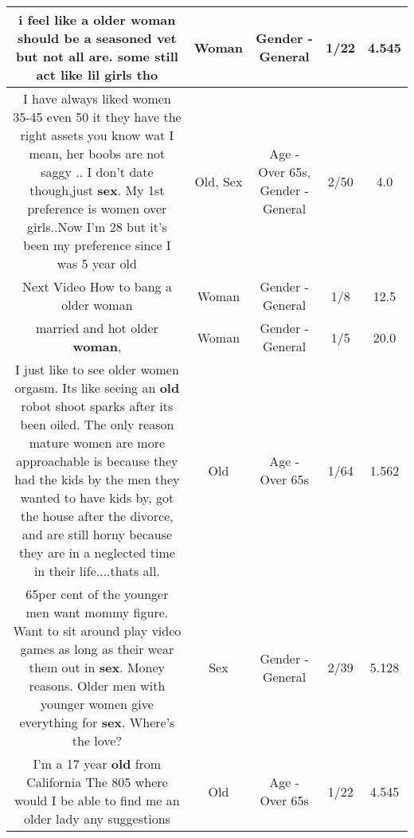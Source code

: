 \documentclass[11pt]{article}
\newlength\mylength
\begin{document}
\begin{center}
\begin{longtable}{|C{.65\mylength}|C{.30\mylength}|C{.12\mylength}|C{.12\mylength}|C{.12\mylength}|}
  \small i feel like a older \textbf{woman} should be a seasoned vet but not all are. some still act like lil girls tho\normalsize   & Woman & Gender - General & 1/22 & 4.545 \\  \hline
  \small I have always liked women 35-45 even 50 it they have the right assets you know wat I mean, her boobs are not saggy .. I don't date though,just \textbf{sex}. My 1st preference is women over girls..Now I'm 28 but it's been my preference since I was 5 year old\normalsize   & Old, Sex & Age - Over 65s, Gender - General & 2/50 & 4.0 \\  \hline
  \small Next Video How to bang a older woman\normalsize   & Woman & Gender - General & 1/8 & 12.5 \\  \hline
  \small married and hot older \textbf{woman},\normalsize   & Woman & Gender - General & 1/5 & 20.0 \\  \hline
  \small I just like to see older women orgasm. Its like seeing an \textbf{old} robot shoot sparks after its been oiled. The only reason mature women are more approachable is because they had the kids by the men they wanted to have kids by, got the house after the divorce, and are still horny because they are in a neglected time in their life....thats all.\normalsize   & Old & Age - Over 65s & 1/64 & 1.562 \\  \hline
  \small 65per cent of the younger men want mommy figure. Want to sit around play video games as long as their wear them out in \textbf{sex}. Money reasons. Older men with younger women give everything  for \textbf{sex}. Where's the love?\normalsize   & Sex & Gender - General & 2/39 & 5.128 \\  \hline
  \small I'm a 17 year \textbf{old} from California The 805 where would I be able to find me an older lady any suggestions\normalsize   & Old & Age - Over 65s & 1/22 & 4.545 \\  \hline

\end{longtable}
\end{center}
\end{document}
